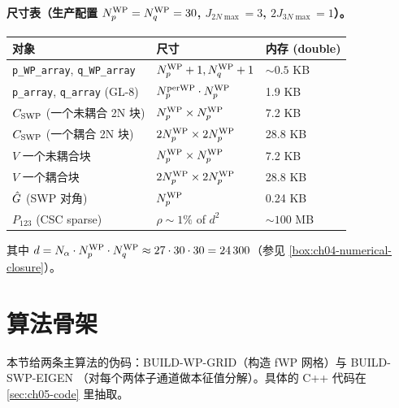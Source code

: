 \paragraph{尺寸表（生产配置 \({N_{p}^{\text{WP}}} = {N_{q}^{\text{WP}}} = 30\), \(J_{2N\max} = 3\),
\(2J_{3N\max} = 1\)）。}
\begin{center}
\begin{tabular}{lll}
\toprule
对象 & 尺寸 & 内存 (double) \\
\midrule
\texttt{p\_WP\_array}, \texttt{q\_WP\_array} & \({N_{p}^{\text{WP}}} + 1, {N_{q}^{\text{WP}}} + 1\) & \(\sim 0.5\) KB \\
\texttt{p\_array}, \texttt{q\_array} (GL-8) & \(N_p^{\rm per WP} \cdot {N_{p}^{\text{WP}}}\) & 1.9 KB \\
\(C_{\rm SWP}\) (一个未耦合 2N 块) & \({N_{p}^{\text{WP}}} \times {N_{p}^{\text{WP}}}\) & 7.2 KB \\
\(C_{\rm SWP}\) (一个耦合 2N 块) & \(2{N_{p}^{\text{WP}}} \times 2{N_{p}^{\text{WP}}}\) & 28.8 KB \\
\(V\) 一个未耦合块  & \({N_{p}^{\text{WP}}} \times {N_{p}^{\text{WP}}}\) & 7.2 KB \\
\(V\) 一个耦合块    & \(2{N_{p}^{\text{WP}}} \times 2{N_{p}^{\text{WP}}}\) & 28.8 KB \\
\(\hat{G}\) (SWP 对角)  & \({N_{p}^{\text{WP}}}\) & 0.24 KB \\
\midrule
\(P_{123}\) (CSC sparse) & \(\rho \sim 1\%\) of \(d^2\) & \(\sim 100\) MB \\
\bottomrule
\end{tabular}
\end{center}
其中 \(d = N_\alpha \cdot {N_{p}^{\text{WP}}} \cdot {N_{q}^{\text{WP}}} \approx 27 \cdot 30 \cdot 30
= 24\,300\)（参见 \cref{box:ch04-numerical-closure}）。

\section{算法骨架}
\label{sec:ch05-algorithm}

本节给两条主算法的伪码：BUILD-WP-GRID（构造 fWP 网格）与 BUILD-SWP-EIGEN
（对每个两体子通道做本征值分解）。具体的 C++ 代码在 \cref{sec:ch05-code}
里抽取。

